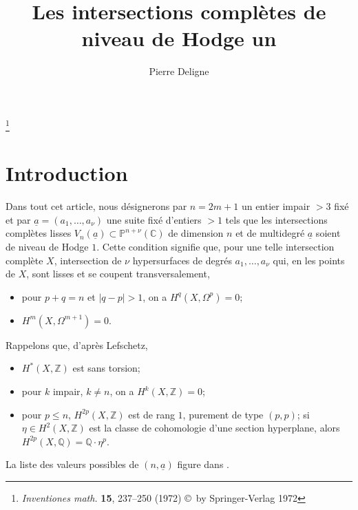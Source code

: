 \documentclass[10pt,leqno]{amsart}
\theoremstyle{plain}
\theoremstyle{definition}
\theoremstyle{remark}
\newcommand{\ZZ}{\mathbb{Z}}
\newcommand{\QQ}{\mathbb{Q}}
\newcommand{\CC}{\mathbb{C}}
\newcommand{\PP}{\mathbb{P}}
\newcommand{\ua}{\underline{a}}
\begin{document}
\title{Les intersections compl\`etes de niveau de Hodge un}
\author{Pierre Deligne}
\address{(Bures-sur-Yvette)}
\thanks{\textit{Inventiones math.} \textbf{15}, 237--250 (1972) \copyright\ by Springer-Verlag 1972}

\maketitle

\section*{Introduction}

Dans tout cet article, nous d\'esignerons par $n=2m+1$ un entier impair $>3$ fix\'e et par $\ua=(a_1,\ldots,a_\nu)$ une suite fix\'e d'entiers $>1$ tels que les intersections compl\`etes lisses $V_n(\ua)\subset\PP^{n+\nu}(\CC)$ de dimension $n$ et de multidegr\'e $\ua$ soient de niveau de Hodge $1$. Cette condition signifie que, pour une telle intersection compl\`ete $X$, intersection de $\nu$ hypersurfaces de degr\'es $a_1,\ldots,a_\nu$ qui, en les points de $X$, sont lisses et se coupent transversalement,
\begin{itemize}
\item[a)] pour $p+q=n$ et $|q-p|>1$, on a $H^q(X,\Omega^p)=0$;
\item[b)] $H^m(X,\Omega^{m+1})=0$.
\end{itemize}

Rappelons que, d'apr\`es Lefschetz,
\begin{itemize}
\item[c)] $H^*(X,\ZZ)$ est sans torsion;
\item[d)] pour $k$ impair, $k\neq n$, on a $H^k(X,\ZZ)=0$;
\item[e)] pour $p\le n$, $H^{2p}(X,\ZZ)$ est de rang $1$, purement de type $(p,p)$; si $\eta\in H^2(X,\ZZ)$ est la classe de cohomologie d'une section hyperplane, alors $H^{2p}(X,\QQ)=\QQ\cdot\eta^p$.
\end{itemize}

La liste des valeurs possibles de $(n,\ua)$ figure dans \cite{10}.
\end{document}
